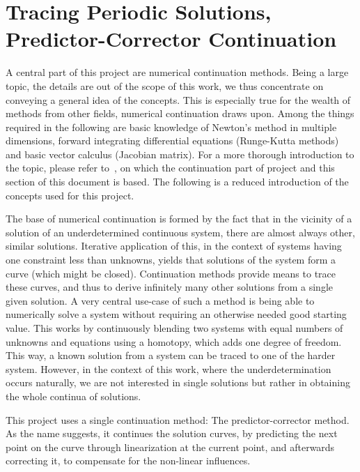\section{Tracing Periodic Solutions, Predictor-Corrector Continuation}
\label{sec:cont}


A central part of this project are numerical continuation methods.
Being a large topic, the details are out of the scope of this work, we thus concentrate on conveying a general idea of the concepts.
This is especially true for the wealth of methods from other fields, numerical continuation draws upon.
Among the things required in the following are basic knowledge of Newton's method in multiple dimensions, forward integrating differential equations (Runge-Kutta methods) and basic vector calculus (Jacobian matrix).
For a more thorough introduction to the topic, please refer to~\cite{allgower1990numerical}, on which the continuation part of project and this section of this document is based.
The following is a reduced introduction of the concepts used for this project. %

The base of numerical continuation is formed by the fact that in the vicinity of a solution of an underdetermined continuous system, there are almost always other, similar solutions. %
Iterative application of this, in the context of systems having one constraint less than unknowns, yields that solutions of the system form a curve (which might be closed).
Continuation methods provide means to trace these curves, and thus to derive infinitely many other solutions from a single given solution.
A very central use-case of such a method is being able to numerically solve a system without requiring an otherwise needed good starting value.
This works by continuously blending two systems with equal numbers of unknowns and equations using a homotopy, which adds one degree of freedom.
This way, a known solution from a system can be traced to one of the harder system.
However, in the context of this work, where the underdetermination occurs naturally, we are not interested in single solutions but rather in obtaining the whole continua of solutions.

This project uses a single continuation method: The predictor-corrector method.
As the name suggests, it continues the solution curves, by predicting the next point on the curve through linearization at the current point, and afterwards correcting it, to compensate for the non-linear influences.

